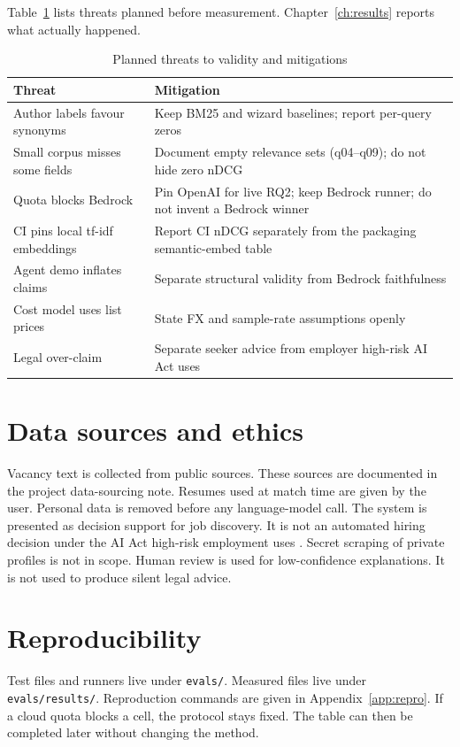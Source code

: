Table~\ref{tab:threats-plan} lists threats planned before measurement. Chapter~\ref{ch:results} reports what actually happened.

\begin{table}[ht]
\centering
\caption{Planned threats to validity and mitigations}
\label{tab:threats-plan}
\begin{tabularx}{\textwidth}{@{}lX@{}}
\toprule
\textbf{Threat} & \textbf{Mitigation} \\
\midrule
Author labels favour synonyms & Keep BM25 and wizard baselines; report per-query zeros \\
Small corpus misses some fields & Document empty relevance sets (q04--q09); do not hide zero nDCG \\
Quota blocks Bedrock & Pin OpenAI for live RQ2; keep Bedrock runner; do not invent a Bedrock winner \\
CI pins local tf-idf embeddings & Report CI nDCG separately from the packaging semantic-embed table \\
Agent demo inflates claims & Separate structural validity from Bedrock faithfulness \\
Cost model uses list prices & State FX and sample-rate assumptions openly \\
Legal over-claim & Separate seeker advice from employer high-risk AI Act uses \\
\bottomrule
\end{tabularx}
\end{table}

\section{Data sources and ethics}
\label{sec:ethics}

Vacancy text is collected from public sources. These sources are documented in the project data-sourcing note. Resumes used at match time are given by the user. Personal data is removed before any language-model call. The system is presented as decision support for job discovery. It is not an automated hiring decision under the AI Act high-risk employment uses . Secret scraping of private profiles is not in scope. Human review is used for low-confidence explanations. It is not used to produce silent legal advice.

\section{Reproducibility}
\label{sec:repro}

Test files and runners live under \texttt{evals/}. Measured files live under \texttt{evals/results/}. Reproduction commands are given in Appendix~\ref{app:repro}. If a cloud quota blocks a cell, the protocol stays fixed. The table can then be completed later without changing the method.
